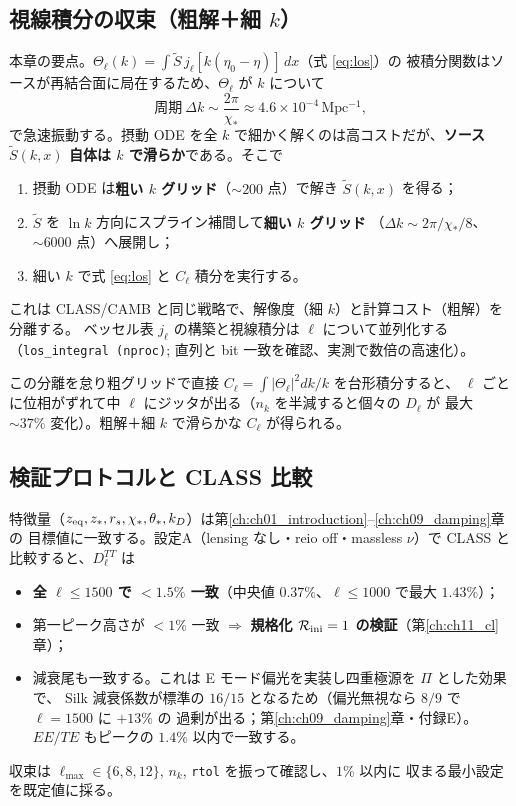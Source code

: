 \subsection{視線積分の収束（粗解＋細 $k$）}
本章の要点。$\Theta_\ell(k)=\int\tilde S\,j_\ell[k(\eta_0-\eta)]\,dx$（式 \eqref{eq:los}）の
被積分関数はソースが再結合面に局在するため、$\Theta_\ell$ が $k$ について
\begin{equation}
  \text{周期}\ \Delta k\sim\frac{2\pi}{\chi_*}\approx4.6\times10^{-4}\,\mathrm{Mpc^{-1}},
\end{equation}
で急速振動する。摂動 ODE を全 $k$ で細かく解くのは高コストだが、\textbf{ソース
$\tilde S(k,x)$ 自体は $k$ で滑らか}である。そこで
\begin{enumerate}
  \item 摂動 ODE は\textbf{粗い $k$ グリッド}（$\sim200$ 点）で解き $\tilde S(k,x)$ を得る；
  \item $\tilde S$ を $\ln k$ 方向にスプライン補間して\textbf{細い $k$ グリッド}
  （$\Delta k\sim2\pi/\chi_*/8$、$\sim6000$ 点）へ展開し；
  \item 細い $k$ で式 \eqref{eq:los} と $C_\ell$ 積分を実行する。
\end{enumerate}
これは CLASS/CAMB と同じ戦略で、解像度（細 $k$）と計算コスト（粗解）を分離する。
ベッセル表 $j_\ell$ の構築と視線積分は $\ell$ について並列化する（\texttt{los\_integral
(nproc)}; 直列と bit 一致を確認、実測で数倍の高速化）。

\begin{numreality}
この分離を怠り粗グリッドで直接 $C_\ell=\int|\Theta_\ell|^2 dk/k$ を台形積分すると、
$\ell$ ごとに位相がずれて中 $\ell$ にジッタが出る（$n_k$ を半減すると個々の $D_\ell$ が
最大 $\sim37\%$ 変化）。粗解＋細 $k$ で滑らかな $C_\ell$ が得られる。
\end{numreality}

\subsection{検証プロトコルと CLASS 比較}
特徴量（$z_{\rm eq},z_*,r_s,\chi_*,\theta_*,k_D$）は第\ref{ch:ch01_introduction}--\ref{ch:ch09_damping}章の
目標値に一致する。設定A（lensing なし・reio off・massless $\nu$）で CLASS と
比較すると、$D_\ell^{TT}$ は
\begin{itemize}
  \item \textbf{全 $\ell\le1500$ で $<1.5\%$ 一致}（中央値 $0.37\%$、$\ell\le1000$ で最大 $1.43\%$）；
  \item 第一ピーク高さが $<1\%$ 一致 $\Rightarrow$ \textbf{規格化 $\mathcal R_{\rm ini}=1$ の検証}（第\ref{ch:ch11_cl}章）；
  \item 減衰尾も一致する。これは E モード偏光を実装し四重極源を $\Pi$ とした効果で、
  Silk 減衰係数が標準の $16/15$ となるため（偏光無視なら $8/9$ で $\ell=1500$ に $+13\%$ の
  過剰が出る；第\ref{ch:ch09_damping}章・付録E）。$EE/TE$ もピークの $1.4\%$ 以内で一致する。
\end{itemize}
収束は $\ell_{\max}\in\{6,8,12\}$, $n_k$, \texttt{rtol} を振って確認し、$1\%$ 以内に
収まる最小設定を既定値に採る。


